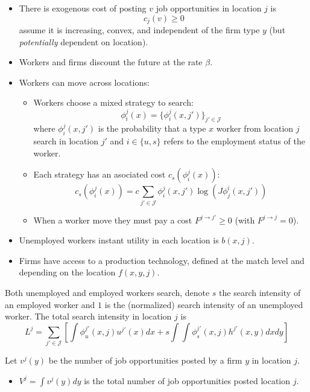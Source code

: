 \documentclass[
  letterpaper,
  DIV=11,
  numbers=noendperiod]{scrartcl}
\providecommand{\tightlist}{%
  \setlength{\itemsep}{0pt}\setlength{\parskip}{0pt}}\usepackage{longtable,booktabs,array}
\begin{document}
\begin{itemize}
\tightlist
\item
  There is exogenous cost of posting \(v\) job opportunities in location
  \(j\) is \[c_{j}(v)\geq0\] assume it is increasing, convex, and
  independent of the firm type \(y\) (but \emph{potentially} dependent
  on location).
\item
  Workers and firms discount the future at the rate \(\beta\).
\item
  Workers can move across locations:

  \begin{itemize}
  \tightlist
  \item
    Workers choose a mixed strategy to search: \[
    \phi^j_i(x) = \{\phi^j_i(x, j')\}_{j'\in \mathcal{J}}
    \] where \(\phi^j_i(x, j')\) is the probability that a type \(x\)
    worker from location \(j\) search in location \(j'\) and
    \(i\in \{u,s\}\) refers to the employment status of the worker.
  \item
    Each strategy has an asociated cost \(c_s(\phi_i^j(x))\):
    \[c_s(\phi^j_i(x)) = c \sum_{j'\in \mathcal{J}}\phi^j_i(x, j')\log{(J\phi^i_j(x, j'))}\]
  \item
    When a worker move they must pay a cost \(F^{j \to j'}\geq 0\) (with
    \(F^{j\to j} = 0\)).
  \end{itemize}
\item
  Unemployed workers instant utility in each location is \(b(x,j)\).
\item
  Firms have access to a production technology, defined at the match
  level and depending on the location \(f(x, y, j)\).
\end{itemize}

Both unemployed and employed workers search, denote \(s\) the search
intensity of an employed worker and \(1\) is the (normalized) search
intensity of an unemployed worker. The total search intensity in
location \(j\) is
\[L^j = \sum_{j'\in\mathcal{J}}\left[\int \phi_u^{j'}(x,j)u^{j'}(x) dx + s\int\int \phi_s^{j'}(x,j)h^{j'}(x,y)dx dy\right]\]

Let \(v^j(y)\) be the number of job opportunities posted by a firm \(y\)
in location \(j\).

\begin{itemize}
\tightlist
\item
  \(V^j= \int v^j(y) dy\) is the total number of job opportunities
  posted location \(j\).
\end{itemize}
\end{document}
